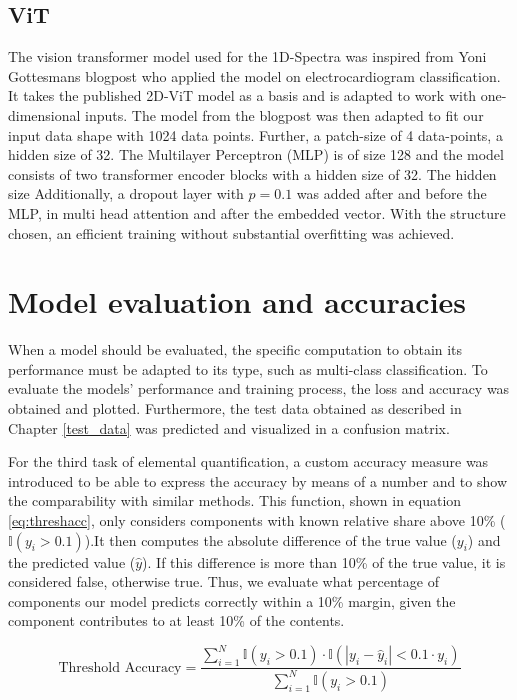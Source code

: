 \subsection{ViT}
The vision transformer model used for the 1D-Spectra was inspired from Yoni Gottesmans blogpost \cite{noauthor_interpretable_2023} who applied the model on electrocardiogram classification. 
It takes the published 2D-ViT model \cite{dosovitskiy_image_2021}as a basis and is adapted to work with one-dimensional inputs.
The model from the blogpost was then adapted to fit our input data shape with 1024 data points. Further, a patch-size of 4 data-points, a hidden size of 32. The Multilayer Perceptron (MLP) is of size 128 and the model consists of two transformer encoder blocks with a hidden size of 32. The hidden size  Additionally, a dropout layer with $p=0.1$ was added after and before the MLP, 
in multi head attention and after the embedded vector.
With the structure chosen, an efficient training without substantial overfitting was achieved. 



\section{Model evaluation and accuracies}

When a model should be evaluated, the specific computation to obtain its performance must be adapted to its type, such as multi-class classification. 
To evaluate the models' performance and training process, the loss and accuracy was obtained and plotted. Furthermore, the test data obtained as described in Chapter \ref{test_data} was predicted and visualized in a confusion matrix.

For the third task of elemental quantification, a custom accuracy measure was introduced to be able to express the accuracy by means of a number and to show the comparability with similar methods. This function, shown in equation \ref{eq:threshacc}, only considers components with known relative share above 10\% ($\mathbb{I}(y_i > 0.1)$).It then computes the absolute difference of the true value ($y_{i}$) and the predicted value ($\hat{y}$). If this difference is more than 10\% of the true value, it is considered false, otherwise true. Thus, we evaluate what percentage of components our model predicts correctly within a 10\% margin, given the component contributes to at least 10\% of the contents.

\begin{equation}
\label{eq:threshacc}
\text{Threshold Accuracy} = \frac{\sum_{i=1}^{N} \mathbb{I}(y_i > 0.1) \cdot \mathbb{I}(|y_i - \hat{y}_i| < 0.1 \cdot y_i)}{\sum_{i=1}^{N} \mathbb{I}(y_i > 0.1)}
\end{equation}

